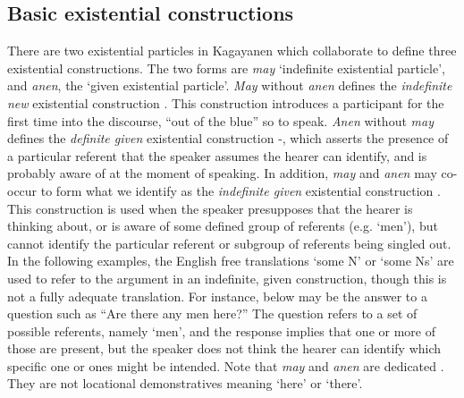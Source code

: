 \subsection{Basic existential constructions}
\label{ex:basicexistentialconstructions}

There are two existential particles in Kagayanen which collaborate to define three existential constructions. The two forms are \textit{may} ‘indefinite existential particle’, and \textit{anen}, the ‘given existential particle’. \textit{May} without \textit{anen} defines the \textit{indefinite new} existential construction . This construction introduces a participant for the first time into the discourse, “out of the blue” so to speak. \textit{Anen} without \textit{may} defines the \textit{definite given} existential construction -, which asserts the presence of a particular referent that the speaker assumes the hearer can identify, and is probably aware of at the moment of speaking. In addition, \textit{may} and \textit{anen} may co-occur to form what we identify as the \textit{indefinite given} existential construction . This construction is used when the speaker presupposes that the hearer is thinking about, or is aware of some defined group of referents (e.g. ‘men’), but cannot identify the particular referent or subgroup of referents being singled out. In the following examples, the English free translations ‘some N’ or ‘some Ns’ are used to refer to the argument in an indefinite, given construction, though this is not a fully adequate translation. For instance,  below may be the answer to a question such as “Are there any men here?” The question refers to a set of possible referents, namely ‘men’, and the response implies that one or more of those are present, but the speaker does not think the hearer can identify which specific one or ones might be intended. Note that \textit{may} and \textit{anen} are dedicated . They are not locational demonstratives meaning ‘here’ or ‘there’.
 
